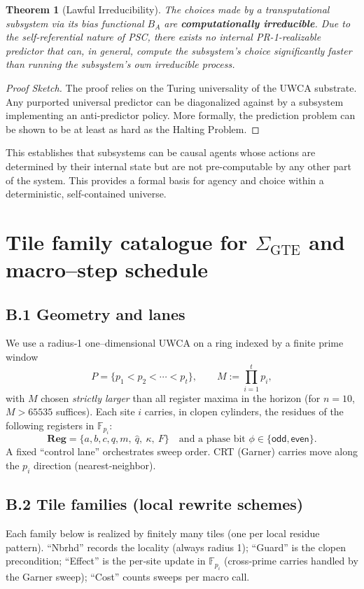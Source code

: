 \documentclass[12pt]{article}
\newtheorem{theorem}{Theorem}[section]
\numberwithin{equation}{section}
\begin{document}
\begin{theorem}[Lawful Irreducibility]
\label{thm:lawful_irreducibility_ugp}
The choices made by a transputational subsystem via its bias functional $B_A$ are \textbf{computationally irreducible}. Due to the self-referential nature of PSC, there exists no internal PR-1-realizable predictor that can, in general, compute the subsystem's choice significantly faster than running the subsystem's own irreducible process.
\end{theorem}
\begin{proof}[Proof Sketch]
The proof relies on the Turing universality of the UWCA substrate. Any purported universal predictor can be diagonalized against by a subsystem implementing an anti-predictor policy. More formally, the prediction problem can be shown to be at least as hard as the Halting Problem.
\end{proof}

This establishes that subsystems can be causal agents whose actions are determined by their internal state but are not pre-computable by any other part of the system. This provides a formal basis for agency and choice within a deterministic, self-contained universe.

\section{Tile family catalogue for \texorpdfstring{$\Sigma_{\mathrm{GTE}}$}{Σ\_GTE} and macro–step schedule}\label{app:tiles}

\subsection*{B.1  Geometry and lanes}
We use a radius‑1 one–dimensional UWCA on a ring indexed by a finite prime window
\[
P=\{p_1<p_2<\cdots<p_t\},\qquad M:=\prod_{i=1}^t p_i,
\]
with \(M\) chosen \emph{strictly larger} than all register maxima in the horizon (for \(n{=}10\), \(M>65535\) suffices). Each site \(i\) carries, in clopen cylinders, the residues of the following registers in \(\mathbb{F}_{p_i}\):
\[
\mathbf{Reg}=\{a,b,c,q,m,\ \hat q,\ \kappa,\ F\}\quad\text{and a phase bit }\phi\in\{\textsf{odd},\textsf{even}\}.
\]
A fixed ``control lane'' orchestrates sweep order. CRT (Garner) carries move along the \(p_i\) direction (nearest‑neighbor).

\subsection*{B.2  Tile families (local rewrite schemes)}
Each family below is realized by finitely many tiles (one per local residue pattern). ``Nbrhd'' records the locality (always radius 1); ``Guard'' is the clopen precondition; ``Effect'' is the per‑site update in \(\mathbb{F}_{p_i}\) (cross‑prime carries handled by the Garner sweep); ``Cost'' counts sweeps per macro call.
\end{document}
